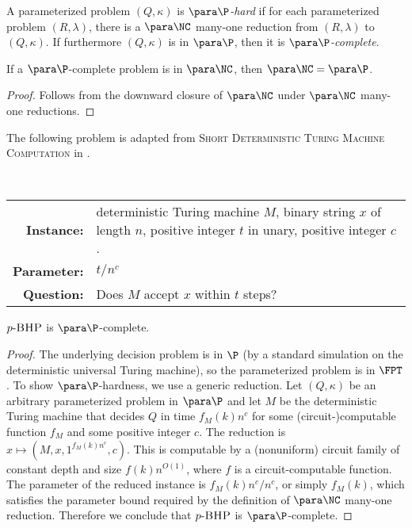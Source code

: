 \documentclass{article}
\newcommand{\dash}{\textnormal{-}}
\newcommand{\pBHP}{p \dash \textsc{BHP}}
\begin{document}
\begin{definition}
  A parameterized problem $(Q, \kappa)$ is \emph{$\para \P$-hard} if for each parameterized problem $(R, \lambda)$, there is a $\para \NC$ many-one reduction from $(R, \lambda)$ to $(Q, \kappa)$.
  If furthermore $(Q, \kappa)$ is in $\para \P$, then it is \emph{$\para \P$-complete}.
\end{definition}

\begin{proposition}
  If a $\para \P$-complete problem is in $\para \NC$, then $\para \NC = \para \P$.
\end{proposition}
\begin{proof}
  Follows from the downward closure of $\para \NC$ under $\para \NC$ many-one reductions.
\end{proof}

The following problem is adapted from \textsc{Short Deterministic Turing Machine Computation} in \autocite{cesati06}.

\begin{definition}[$p \dash \textsc{Bounded Halting Problem}$, aka $\pBHP$]
  \mbox{} \\
  \begin{tabular}{r p{9.2cm}}
    \textbf{Instance:} & deterministic Turing machine $M$, binary string $x$ of length $n$, positive integer $t$ in unary, positive integer $c$. \\
    \textbf{Parameter:} & $t / n^c$ \\
    \textbf{Question:} & Does $M$ accept $x$ within $t$ steps?
  \end{tabular}
\end{definition}

\begin{theorem}
  $\pBHP$ is $\para \P$-complete.
\end{theorem}
\begin{proof}
  The underlying decision problem is in $\P$ (by a standard simulation on the deterministic universal Turing machine), so the parameterized problem is in $\FPT$.
  To show $\para \P$-hardness, we use a generic reduction.
  Let $(Q, \kappa)$ be an arbitrary parameterized problem in $\para \P$ and let $M$ be the deterministic Turing machine that decides $Q$ in time $f_M(k) n^c$ for some (circuit-)computable function $f_M$ and some positive integer $c$.
  The reduction is $x \mapsto (M, x, 1^{f_M(k) n^c}, c)$.
  This is computable by a (nonuniform) circuit family of constant depth and size $f(k) n^{O(1)}$, where $f$ is a circuit-computable function.
  The parameter of the reduced instance is $f_M(k) n^c / n^c$, or simply $f_M(k)$, which satisfies the parameter bound required by the definition of $\para \NC$ many-one reduction.
  Therefore we conclude that $\pBHP$ is $\para \P$-complete.
\end{proof}
\end{document}

